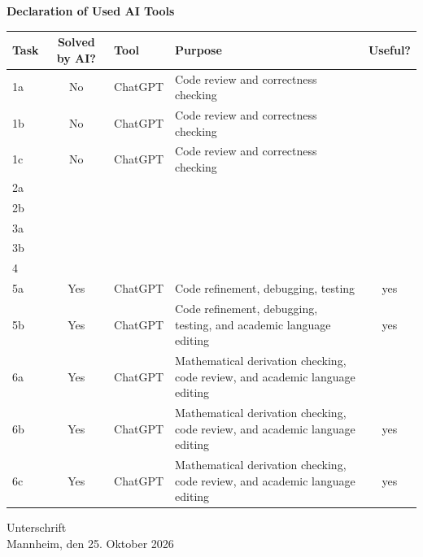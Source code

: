 %
%
\begin{center}
  \textbf{Declaration of Used AI Tools} \\[.3em]

  \begin{tabularx}{\textwidth}{lclXc}
    \toprule
    Task & Solved by AI? & Tool & Purpose & Useful? \\
    \midrule
    1a & No & ChatGPT & Code review and correctness checking & \\
    1b & No & ChatGPT & Code review and correctness checking & \\
    1c & No & ChatGPT & Code review and correctness checking & \\
    2a & & & & \\
    2b & & & & \\
    3a & & & & \\
    3b & & & & \\
    4 & & & & \\
    5a & Yes & ChatGPT & Code refinement, debugging, testing & yes \\
    5b & Yes & ChatGPT & Code refinement, debugging, testing, and academic language editing & yes \\
    6a & Yes & ChatGPT & Mathematical derivation checking, code review, and academic language editing \\
    6b & Yes & ChatGPT & Mathematical derivation checking, code review, and academic language editing & yes \\
    6c & Yes & ChatGPT & Mathematical derivation checking, code review, and academic language editing & yes \\
    \bottomrule
  \end{tabularx}
\end{center}

\vspace{2cm}
\noindent Unterschrift\\
\noindent Mannheim, den 25. Oktober 2026\hfill

